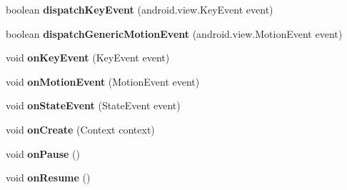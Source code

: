 \begin{DoxyCompactItemize}
\item 
\mbox{\label{classorg_1_1cocos2dx_1_1lib_1_1GameControllerMoga_ab80255cc454b1a97b07e68d8b08678b9}} 
boolean {\bfseries dispatch\+Key\+Event} (android.\+view.\+Key\+Event event)
\item 
\mbox{\label{classorg_1_1cocos2dx_1_1lib_1_1GameControllerMoga_ad9c238267baec0f597b2f6370bed3045}} 
boolean {\bfseries dispatch\+Generic\+Motion\+Event} (android.\+view.\+Motion\+Event event)
\item 
\mbox{\label{classorg_1_1cocos2dx_1_1lib_1_1GameControllerMoga_aa3c77017537261aa586c20dc5e7c651e}} 
void {\bfseries on\+Key\+Event} (Key\+Event event)
\item 
\mbox{\label{classorg_1_1cocos2dx_1_1lib_1_1GameControllerMoga_ad373034805e3be699aa48ba801c7fee8}} 
void {\bfseries on\+Motion\+Event} (Motion\+Event event)
\item 
\mbox{\label{classorg_1_1cocos2dx_1_1lib_1_1GameControllerMoga_af524d314304c0c86fbd119736bff9e2e}} 
void {\bfseries on\+State\+Event} (State\+Event event)
\item 
\mbox{\label{classorg_1_1cocos2dx_1_1lib_1_1GameControllerMoga_a0fcee240e8e1cc6e6fd5c93091a8eced}} 
void {\bfseries on\+Create} (Context context)
\item 
\mbox{\label{classorg_1_1cocos2dx_1_1lib_1_1GameControllerMoga_a1736a2f2f1bedcdbad4ac8ba16479e88}} 
void {\bfseries on\+Pause} ()
\item 
\mbox{\label{classorg_1_1cocos2dx_1_1lib_1_1GameControllerMoga_af5ae5615dfb6cd7e633c3465b4dc5afd}} 
void {\bfseries on\+Resume} ()
\item 
\mbox{\label{classorg_1_1cocos2dx_1_1lib_1_1GameControllerMoga_a739699e2b7d3d9848d14679a3e927ea9}} 

\end{DoxyCompactItemize}
